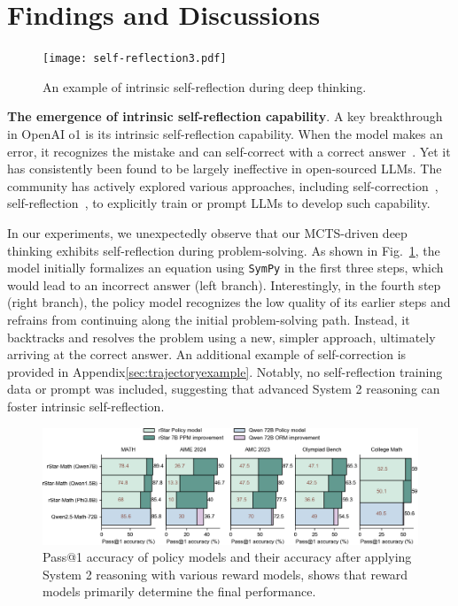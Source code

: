 \section{Findings and Discussions} 

\begin{figure}[ht]
	\centering
	\texttt{[image: self-reflection3.pdf]}	
	\vspace{-3ex}
	\caption{An example of intrinsic self-reflection during {\sysname} deep thinking.}
	\label{fig:selfcorrect}
\end{figure}


 \noindent\textbf{The emergence of intrinsic self-reflection capability}. A key breakthrough in OpenAI  o1 is its intrinsic self-reflection capability. When the model makes an error, it recognizes the mistake and can  self-correct with a correct answer~\citep{o1backtracing}. Yet it has consistently 
 been found to be largely ineffective in open-sourced LLMs. The community has actively explored various approaches, including self-correction~\citep{huang2023large,kumar2024training}, self-reflection~\citep{renze2024self,shinn2024reflexion},  to explicitly train or prompt LLMs to develop  such capability. 


 
 In our experiments, we unexpectedly observe that our  MCTS-driven deep thinking  exhibits self-reflection during  problem-solving.  As shown in Fig.~\ref{fig:selfcorrect}, the model initially formalizes an equation using \texttt{SymPy} in the first three steps, which would lead to an incorrect answer (left branch). Interestingly, in the fourth step (right branch), the policy model recognizes the low quality of its earlier steps and refrains from continuing along the initial problem-solving path. Instead, it backtracks and resolves the problem using a new, simpler approach, ultimately arriving at the correct answer. An additional example of self-correction is provided in Appendix\ref{sec:trajectoryexample}. Notably, no self-reflection training data or prompt was included, suggesting that advanced System 2 reasoning can foster intrinsic self-reflection.
 

 
 
 

 
\begin{figure}[ht]
	\centering
	\includegraphics[width=1\textwidth]{ppm_study.png}	
	\vspace{-3ex}
	\caption{Pass@1 accuracy of policy models and their accuracy after applying System 2 reasoning with various reward models, shows that reward models primarily determine the final performance.}
	\label{fig:ppmstudy}
\end{figure}

